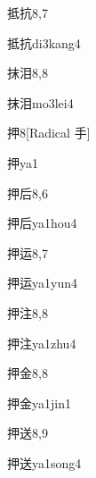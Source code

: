 \begin{entry}{抵抗}{8,7}
  \begin{phonetics}{抵抗}{di3kang4}
  \end{phonetics}
\end{entry}

\begin{entry}{抹泪}{8,8}
  \begin{phonetics}{抹泪}{mo3lei4}
  \end{phonetics}
\end{entry}

\begin{entry}{押}{8}[Radical 手]
  \begin{phonetics}{押}{ya1}
  \end{phonetics}
\end{entry}

\begin{entry}{押后}{8,6}
  \begin{phonetics}{押后}{ya1hou4}
  \end{phonetics}
\end{entry}

\begin{entry}{押运}{8,7}
  \begin{phonetics}{押运}{ya1yun4}
  \end{phonetics}
\end{entry}

\begin{entry}{押注}{8,8}
  \begin{phonetics}{押注}{ya1zhu4}
  \end{phonetics}
\end{entry}

\begin{entry}{押金}{8,8}
  \begin{phonetics}{押金}{ya1jin1}
  \end{phonetics}
\end{entry}

\begin{entry}{押送}{8,9}
  \begin{phonetics}{押送}{ya1song4}
  \end{phonetics}
\end{entry}

